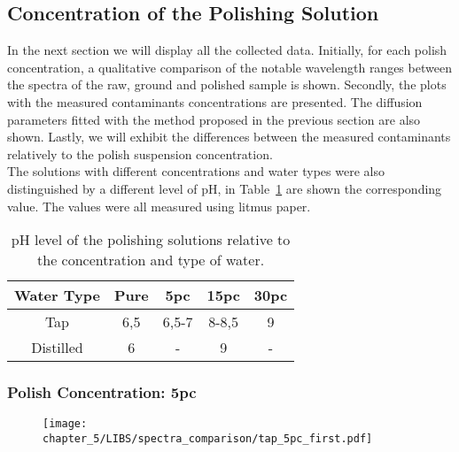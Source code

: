 \subsection{Concentration of the Polishing Solution}
\label{subsec:conc_results}
In the next section we will display all the collected data. Initially, for each polish concentration, a qualitative comparison of the notable wavelength ranges between the spectra of the raw, ground and polished sample is shown. Secondly, the plots with the measured contaminants concentrations are presented. The diffusion parameters fitted with the method proposed in the previous section are also shown. Lastly, we will exhibit the differences between the measured contaminants relatively to the polish suspension concentration.
\\
The solutions with different concentrations and water types were also distinguished by a different level of pH, in Table~\ref{table:solution_ph} are shown the corresponding value. The values were all measured using litmus paper.

\begin{table}[H]
   \centering
   \begin{tabular}{lclll}
   \hline
   \multicolumn{1}{|c|}{Water Type} & \multicolumn{1}{c|}{Pure} & \multicolumn{1}{c|}{5pc}   & \multicolumn{1}{c|}{15pc}  & \multicolumn{1}{c|}{30pc} \\ \hline
   \multicolumn{1}{|c|}{Tap}        & \multicolumn{1}{c|}{6,5}  & \multicolumn{1}{c|}{6,5-7} & \multicolumn{1}{c|}{8-8,5} & \multicolumn{1}{c|}{9}    \\ \hline
   \multicolumn{1}{|c|}{Distilled}  & \multicolumn{1}{c|}{6}    & \multicolumn{1}{c|}{-}     & \multicolumn{1}{c|}{9}     & \multicolumn{1}{c|}{-}    \\ \hline
   \end{tabular}
   \caption{pH level of the polishing solutions relative to the concentration and type of water.}
        \label{table:solution_ph}
   \end{table}
\subsubsection{Polish Concentration: 5pc}
\label{subsubsec:5pc}
\vspace*{-25pt}
\begin{figure}[H]
    \centering
    \texttt{[image: chapter\_5/LIBS/spectra\_comparison/tap\_5pc\_first.pdf]} 
 \end{figure}

